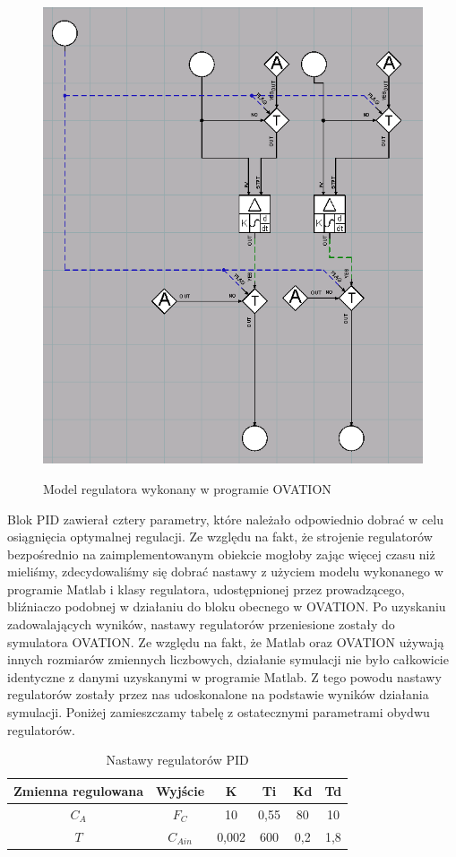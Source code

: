 \begin{figure}[h!]
	\centering
	\includegraphics[width=.6\linewidth]{img/PID.png}
	\label{ch2:regulator}
	\caption{Model regulatora wykonany w programie OVATION}
\end{figure}
\newpage
Blok PID zawierał cztery parametry, które należało odpowiednio dobrać w celu osiągnięcia optymalnej regulacji. Ze względu na fakt, że strojenie regulatorów bezpośrednio na zaimplementowanym obiekcie mogłoby zając więcej czasu niż mieliśmy, zdecydowaliśmy się dobrać nastawy z użyciem modelu wykonanego w programie Matlab i klasy regulatora, udostępnionej przez prowadzącego, bliźniaczo podobnej w działaniu do bloku obecnego w OVATION. Po uzyskaniu zadowalających wyników, nastawy regulatorów przeniesione zostały do symulatora OVATION. Ze względu na fakt, że Matlab oraz OVATION używają innych rozmiarów zmiennych liczbowych, działanie symulacji nie było całkowicie identyczne z danymi uzyskanymi w programie Matlab. Z tego powodu nastawy regulatorów zostały przez nas udoskonalone na podstawie wyników działania symulacji. Poniżej zamieszczamy tabelę z ostatecznymi parametrami obydwu regulatorów.

\begin{table}[h!]
	\centering
	\begin{tabular}{|c|c|c|c|c|c|}
		\hline
		Zmienna regulowana&Wyjście&K&Ti&Kd&Td\\\hline
		$C_A$&$F_C$&10&0,55&80&10\\\hline
		$T$&$C_{Ain}$&0,002&600&0,2&1,8\\\hline
	\end{tabular}
\label{tab:pid}
\caption{Nastawy regulatorów PID}
\end{table}

